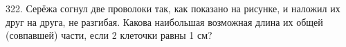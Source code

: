 322. Серёжа согнул две проволоки так, как показано на рисунке, и наложил их друг на друга, не разгибая. Какова наибольшая возможная длина их общей (совпавшей) части, если 2 клеточки равны 1 см?\\
\begin{figure}[ht!]
\end{figure}\\
